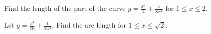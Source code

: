 \documentclass{ximera}
\begin{document}
\begin{question}%

Find the length of the part of the curve \(\displaystyle y = \frac{x^4}{4} + \frac{1}{8x^2}\) for \(1 \leq x \leq 2\).
\begin{multiplechoice}
\end{multiplechoice}

\end{question}

\begin{question}%

Let \(\displaystyle y = \frac{x^4}{16} + \frac{1}{2x^2}\). Find the arc length for \(1 \leq x \leq \sqrt{2}\).
\begin{multiplechoice}
\end{multiplechoice}

\end{question}
\end{document}
